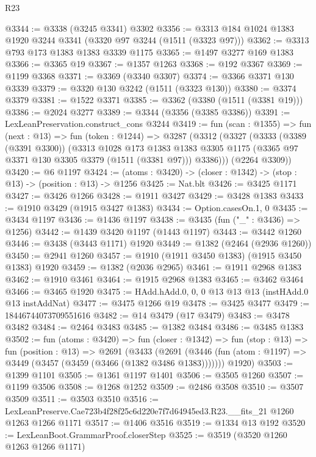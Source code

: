 \begin{lexlean}{R23}
\begin{coremodule}
@3344 := @3338 (@3245 @3341) @3302
@3356 := @3313 @184 @1024 @1383 @1920 @3244 @3341 (@3320 @97 @3244 (@1511 (@3323 @97)))
@3362 := @3313 @793 @173 @1383 @1383 @3339 @1175
@3365 := @1497 @3277 @169 @1383
@3366 := @3365 @19
@3367 := @1357 @1263
@3368 := @192 @3367
@3369 := @1199 @3368
@3371 := @3369 (@3340 @3307)
@3374 := @3366 @3371 @130 @3339
@3379 := @3320 @130 @3242 (@1511 (@3323 @130))
@3380 := @3374 @3379
@3381 := @1522 @3371
@3385 := @3362 (@3380 (@1511 (@3381 @19)))
@3386 := @2024 @3277
@3389 := @3344 (@3356 (@3385 @3386))
@3391 := LexLeanPreservation.construct_cons @3244
@3419 := fun (scan : @1355) =>
  fun (next : @13) =>
  fun (token : @1244) =>
  @3287
    (@3312
      (@3327
        (@3333
          (@3389 (@3391 @3300))
          (@3313
            @1028
            @173
            @1383
            @1383
            @3305
            @1175
            (@3365 @97 @3371 @130 @3305 @3379 (@1511 (@3381 @97)))
            @3386)))
      (@2264 @3309))
@3420 := @6 @1197
@3424 := (atoms : @3420) -> (closer : @1342) -> (stop : @13) -> (position : @13) -> @1256
@3425 := Nat.blt
@3426 := @3425 @1171
@3427 := @3426 @1266
@3428 := @1911 @3427
@3429 := @3428 @1383
@3433 := @1910 @3429 (@1915 @3427 @1383)
@3434 := Option.casesOn.{1, 0}
@3435 := @3434 @1197
@3436 := @1436 @1197
@3438 := @3435 (fun ("_" : @3436) => @1256)
@3442 := @1439 @3420 @1197 (@1443 @1197)
@3443 := @3442 @1260
@3446 := @3438 (@3443 @1171) @1920
@3449 := @1382 (@2464 (@2936 @1260))
@3450 := @2941 @1260
@3457 := @1910 (@1911 @3450 @1383) (@1915 @3450 @1383) @1920
@3459 := @1382 (@2036 @2965)
@3461 := @1911 @2968 @1383
@3462 := @1910 @3461
@3464 := @1915 @2968 @1383
@3465 := @3462 @3464
@3466 := @3465 @1920
@3475 := HAdd.hAdd.{0, 0, 0} @13 @13 @13 (instHAdd.{0} @13 instAddNat)
@3477 := @3475 @1266 @19
@3478 := @3425 @3477
@3479 := 18446744073709551616
@3482 := @14 @3479 (@17 @3479)
@3483 := @3478 @3482
@3484 := @2464 @3483
@3485 := @1382 @3484
@3486 := @3485 @1383
@3502 := fun (atoms : @3420) =>
  fun (closer : @1342) =>
  fun (stop : @13) =>
  fun (position : @13) =>
  @2691
    (@3433
      (@2691 (@3446 (fun (atom : @1197) => @3449 (@3457 (@3459 (@3466 (@1382 @3486 @1383)))))))
      @1920)
@3503 := @1399 @1101
@3505 := @1361 @1197 @1401
@3506 := @3505 @1260
@3507 := @1199 @3506
@3508 := @1268 @1252
@3509 := @2486 @3508
@3510 := @3507 @3509
@3511 := @3503 @3510
@3516 := LexLeanPreserve.Cae723b4f28f25c6d220e7f7d64945ed3.R23.__fits_21 @1260 @1263 @1266 @1171
@3517 := @1406 @3516
@3519 := @1334 @13 @192
@3520 := LexLeanBoot.GrammarProof.closerStep
@3525 := @3519 (@3520 @1260 @1263 @1266 @1171)

\end{coremodule}
\end{lexlean}
